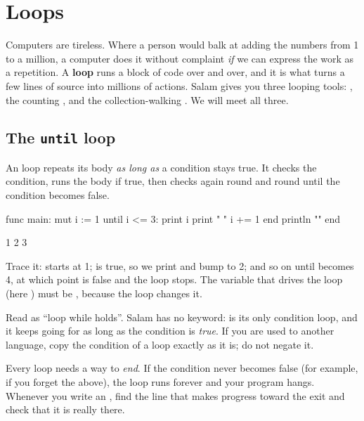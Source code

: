 \chapter{Loops}%
\label{ch:loops}

Computers are tireless. Where a person would balk at adding the numbers from 1 to
a million, a computer does it without complaint \emph{if} we can express the
work as a repetition. A \textbf{loop} runs a block of code over and over, and it
is what turns a few lines of source into millions of actions. Salam gives you
three looping tools: , the counting , and the
collection-walking . We will meet all three.

\section{The \texttt{until} loop}

An  loop repeats its body \emph{as long as} a condition stays true. It
checks the condition, runs the body if true, then checks again round and round
until the condition becomes false.

\begin{salamen}
func main:
    mut i := 1
    until i <= 3:
        print i
        print " "
        i += 1
    end
    println ""
end
\end{salamen}

\begin{progout}
1 2 3
\end{progout}

Trace it:  starts at 1;  is true, so we print  and
bump  to 2; and so on until  becomes 4, at which point
 is false and the loop stops. The variable that drives the loop
(here ) must be , because the loop changes it.

\begin{note}
Read  as ``loop while  holds''. Salam has no
 keyword:  is its only condition loop, and it keeps going
for as long as the condition is \emph{true}. If you are used to another language,
copy the condition of a  loop exactly as it is; do not negate it.
\end{note}

\begin{warn}
Every  loop needs a way to \emph{end}. If the condition never becomes
false (for example, if you forget the  above), the loop runs
forever and your program hangs. Whenever you write an , find the line
that makes progress toward the exit and check that it is really there.
\end{warn}

